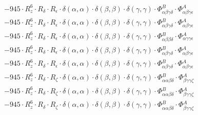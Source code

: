 \documentclass{article}
\begin{document}
\begin{subequations}
\begin{gather}
\begin{array}{c}
 \\[0.2em] 		 - 945 \cdot R_{z}^{6} \cdot R_{\delta{}} \cdot R_{\epsilon{}} \cdot \delta{}\left(\alpha{}, \alpha{}\right) \cdot \delta{}\left(\beta{}, \beta{}\right) \cdot \delta{}\left(\gamma{}, \gamma{}\right) \cdot \Phi{}^{B}_{\alpha{}\beta{}\gamma{}\delta{}} \cdot \Phi{}^{A}_{\alpha{}\beta{}\gamma{}\epsilon{}} 
 \\[0.2em] 		 - 945 \cdot R_{z}^{6} \cdot R_{\delta{}} \cdot R_{\epsilon{}} \cdot \delta{}\left(\alpha{}, \alpha{}\right) \cdot \delta{}\left(\beta{}, \beta{}\right) \cdot \delta{}\left(\gamma{}, \gamma{}\right) \cdot \Phi{}^{B}_{\alpha{}\beta{}\gamma{}\delta{}} \cdot \Phi{}^{A}_{\alpha{}\beta{}\gamma{}\epsilon{}} 
 \\[0.2em] 		 - 945 \cdot R_{z}^{6} \cdot R_{\delta{}} \cdot R_{\epsilon{}} \cdot \delta{}\left(\alpha{}, \alpha{}\right) \cdot \delta{}\left(\beta{}, \beta{}\right) \cdot \delta{}\left(\gamma{}, \gamma{}\right) \cdot \Phi{}^{B}_{\alpha{}\beta{}\beta{}\delta{}} \cdot \Phi{}^{A}_{\alpha{}\gamma{}\gamma{}\epsilon{}} 
 \\[0.2em] 		 - 945 \cdot R_{z}^{6} \cdot R_{\delta{}} \cdot R_{\epsilon{}} \cdot \delta{}\left(\alpha{}, \alpha{}\right) \cdot \delta{}\left(\beta{}, \beta{}\right) \cdot \delta{}\left(\gamma{}, \gamma{}\right) \cdot \Phi{}^{B}_{\alpha{}\beta{}\gamma{}\delta{}} \cdot \Phi{}^{A}_{\alpha{}\beta{}\gamma{}\epsilon{}} 
 \\[0.2em] 		 - 945 \cdot R_{z}^{6} \cdot R_{\delta{}} \cdot R_{\epsilon{}} \cdot \delta{}\left(\alpha{}, \alpha{}\right) \cdot \delta{}\left(\beta{}, \beta{}\right) \cdot \delta{}\left(\gamma{}, \gamma{}\right) \cdot \Phi{}^{B}_{\alpha{}\beta{}\gamma{}\delta{}} \cdot \Phi{}^{A}_{\alpha{}\beta{}\gamma{}\epsilon{}} 
 \\[0.2em] 		 - 945 \cdot R_{z}^{6} \cdot R_{\delta{}} \cdot R_{\zeta{}} \cdot \delta{}\left(\alpha{}, \alpha{}\right) \cdot \delta{}\left(\beta{}, \beta{}\right) \cdot \delta{}\left(\gamma{}, \gamma{}\right) \cdot \Phi{}^{B}_{\alpha{}\alpha{}\beta{}\delta{}} \cdot \Phi{}^{A}_{\beta{}\gamma{}\gamma{}\zeta{}} 
 \\[0.2em] 		 - 945 \cdot R_{z}^{6} \cdot R_{\delta{}} \cdot R_{\zeta{}} \cdot \delta{}\left(\alpha{}, \alpha{}\right) \cdot \delta{}\left(\beta{}, \beta{}\right) \cdot \delta{}\left(\gamma{}, \gamma{}\right) \cdot \Phi{}^{B}_{\alpha{}\alpha{}\beta{}\delta{}} \cdot \Phi{}^{A}_{\beta{}\gamma{}\gamma{}\zeta{}} 
 \\[0.2em] 		 - 945 \cdot R_{z}^{6} \cdot R_{\delta{}} \cdot R_{\zeta{}} \cdot \delta{}\left(\alpha{}, \alpha{}\right) \cdot \delta{}\left(\beta{}, \beta{}\right) \cdot \delta{}\left(\gamma{}, \gamma{}\right) \cdot \Phi{}^{B}_{\alpha{}\alpha{}\beta{}\delta{}} \cdot \Phi{}^{A}_{\beta{}\gamma{}\gamma{}\zeta{}} 

\end{array}
\end{gather}
\end{subequations}
\end{document}
